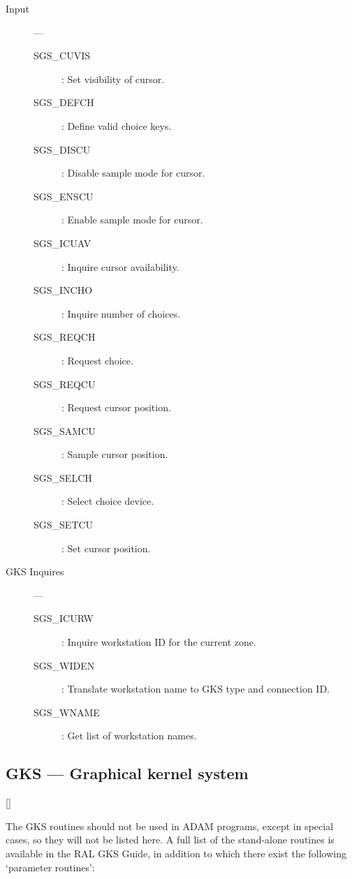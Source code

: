 \begin{description}
\item [Input] ---

\begin{description}
\item [SGS\_CUVIS] : Set visibility of cursor.
\item [SGS\_DEFCH] : Define valid choice keys.
\item [SGS\_DISCU] : Disable sample mode for cursor.
\item [SGS\_ENSCU] : Enable sample mode for cursor.
\item [SGS\_ICUAV] : Inquire cursor availability.
\item [SGS\_INCHO] : Inquire number of choices.
\item [SGS\_REQCH] : Request choice.
\item [SGS\_REQCU] : Request cursor position.
\item [SGS\_SAMCU] : Sample cursor position.
\item [SGS\_SELCH] : Select choice device.
\item [SGS\_SETCU] : Set cursor position.
\end{description}

\item [GKS Inquires] ---

\begin{description}
\item [SGS\_ICURW] : Inquire workstation ID for the current zone.
\item [SGS\_WIDEN] : Translate workstation name to GKS type and connection ID.
\item [SGS\_WNAME] : Get list of workstation names.
\end{description}

\end{description}
                                         
\newpage

\subsection{GKS --- Graphical kernel system} 

\vspace{-9mm}

\hfill []

\vspace{2mm}

The GKS routines should not be used in ADAM programs, except in special cases,
so they will not be listed here.
A full list of the stand-alone routines is available in the RAL GKS Guide, in
addition to which there exist the following `parameter routines':

